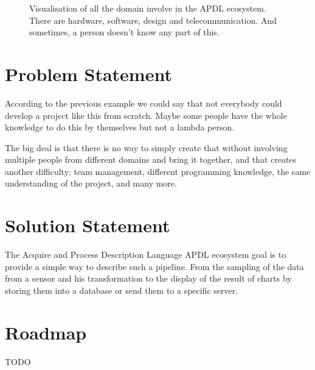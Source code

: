 \begin{figure}[ht]
  \centering
  \caption[Basic APDL architecture example]{ Visualisation of all the domain
involve in the APDL ecosystem. There are hardware, software, design and
telecommunication. And sometimes, a person doesn’t know any part of this.}
  \label{fig:basic_archi}
\end{figure}

\section{Problem Statement}
\label{sec:intro-problem-statement}

According to the previous example we could say that not everybody could develop
a project like this from scratch. Maybe some people have the whole knowledge to
do this by themselves but not a lambda person.

The big deal is that there is no way to simply create that without involving
multiple people from different domains and bring it together, and that creates
another difficulty: team management, different programming knowledge, the same
understanding of the project, and many more.

\section{Solution Statement}
\label{sec:intro-solution-statement}

The Acquire and Process Description Language \gls{APDL} ecosystem goal is to
provide a simple way to describe such a pipeline. From the sampling of the data
from a sensor and his transformation to the display of the result of charts by
storing them into a database or send them to a specific server.

\section{Roadmap}
\label{sec:intro-roadmap}

TODO

